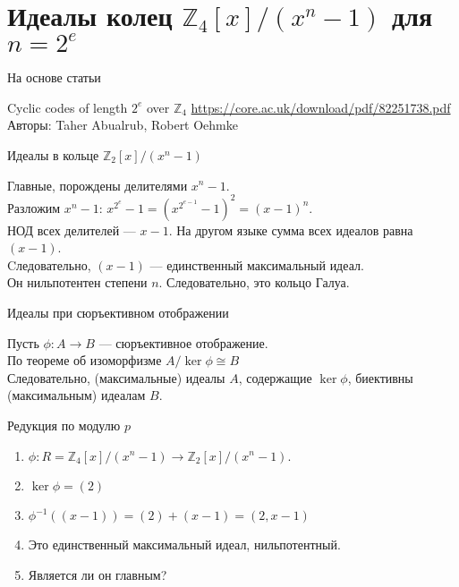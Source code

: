 \documentclass[10pt]{beamer}
\begin{document}
\section{Идеалы колец $\mathbb{Z}_4[x]/(x^n-1)$ для $n = 2^e$}

\begin{frame}{На основе статьи}

\begin{block}{Cyclic codes of length $2^e$ over $\mathbb{Z}_4$}
  \url{https://core.ac.uk/download/pdf/82251738.pdf}\\
  \vspace{0.2cm}
  Авторы: Taher Abualrub, Robert Oehmke
\end{block}

\end{frame}

\begin{frame}{Идеалы в кольце $\mathbb{Z}_2[x]/(x^n-1)$}

 Главные, порождены делителями $x^n-1$.\\
 Разложим $x^n-1$: $x^{2^e}-1 = (x^{2^{e-1}}-1)^2 = (x-1)^n$.\\
 \pause
 \vspace{0.4cm}
 НОД всех делителей --- $x-1$. На другом языке сумма всех идеалов равна $(x-1)$.\\
 Cледовательно, $(x-1)$ --- единственный максимальный идеал.\\
 Он нильпотентен степени $n$. Следовательно, это кольцо Галуа.

\end{frame}

\begin{frame}{Идеалы при сюръективном отображении}

 Пусть $\phi : A \to B$ --- сюръективное отображение.\\
 По теореме об изоморфизме $A/\ker{\phi} \cong B$\\
 \vspace{0,4cm}
 Следовательно, (максимальные) идеалы $A$, содержащие $\ker{\phi}$, биективны (максимальным) идеалам $B$.

\end{frame}

\begin{frame}{Редукция по модулю $p$}

\begin{enumerate}
 \item $\phi : R = \mathbb{Z}_4[x]/(x^n-1) \to \mathbb{Z}_2[x]/(x^n-1)$.\\
 \item $\ker{\phi} = (2)$\\
 \item $\phi^{-1}((x-1)) = (2) + (x-1) = (2, x-1)$\\
 \item Это единственный максимальный идеал, нильпотентный.\\
 \item Является ли он главным?
\end{enumerate}

\end{frame}
\end{document}

